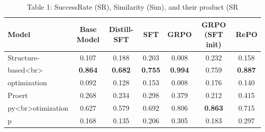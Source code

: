 \begin{table}[t]
\centering
\caption{Table 1: SuccessRate (SR), Similarity (Sim), and their product (SR}
\label{tab:2603.05900}
\begin{tabular}{lcccccc}
\toprule
Model & Base Model & Distill-SFT & SFT & GRPO & GRPO (SFT init) & RePO \\
\midrule
Structure- & 0.107 & 0.188 & 0.203 & 0.008 & 0.232 & 0.158 \\
based<br> & \textbf{0.864} & \textbf{0.682} & \textbf{0.755} & \textbf{0.994} & 0.759 & \textbf{0.887} \\
optimization & 0.092 & 0.128 & 0.153 & 0.008 & 0.176 & 0.140 \\
Proert & 0.268 & 0.234 & 0.298 & 0.379 & 0.212 & 0.415 \\
py<br>otimization & 0.627 & 0.579 & 0.692 & 0.806 & \textbf{0.863} & 0.715 \\
p & 0.168 & 0.135 & 0.206 & 0.305 & 0.183 & 0.297 \\
\bottomrule
\end{tabular}
\end{table}
